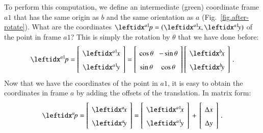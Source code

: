 To perform this computation, we define an intermediate (green) coordinate frame $a1$ that has the same origin as $b$ and the same orientation as $a$ (Fig.~\ref{fig.after-rotate}). What are the coordinates $\aprimep=(\aprimex,\aprimey)$ of the point in frame $a1$? This is simply the rotation by $\theta$ that we have done before:
\[
\spacearray
\aprimep=\left[\begin{array}{c}\aprimex\\\aprimey\end{array}\right]=
\left[\begin{array}{cc}\cos\theta&-\sin\theta\\\sin\theta&\cos\theta\end{array}\right]
\left[\begin{array}{c}\bx\\\by\end{array}\right]\,.
\]
Now that we have the coordinates of the point in $a1$, it is easy to obtain the coordinates in frame $a$ by adding the offsets of the translation. In matrix form:
\[
\spacearray
\ap=\left[\begin{array}{c}\ax\\\ay\end{array}\right]=
\left[\begin{array}{c}\aprimex\\\aprimey\end{array}\right]\,+\,
\left[\begin{array}{c}\Delta x\\\Delta y\end{array}\right]\,.
\]


